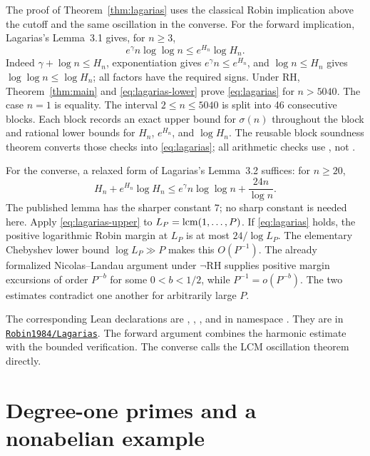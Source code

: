 \documentclass[11pt]{amsart}
\theoremstyle{definition}
\theoremstyle{remark}
\numberwithin{equation}{section}
\newcommand{\RH}{\mathrm{RH}}
\newcommand{\euler}{\gamma}
\newcommand{\sig}{\sigma}
\newcommand{\repositoryurl}{https://github.com/kimihiro64/Robin1984}
\newcommand{\proofrevision}{b359826e62c50b6cef55db4b2fcab793232498cc}
\newcommand{\codedir}[1]{%
  \href{\repositoryurl/tree/\proofrevision/#1}{\nolinkurl{#1}}}
\begin{document}
The proof of Theorem~\ref{thm:lagarias} uses the classical Robin
implication above the cutoff and the same oscillation in the converse.  For the forward implication, Lagarias's Lemma~3.1 gives,
for $n\ge3$,
\begin{equation}\label{eq:lagarias-lower}
  e^{\euler}n\log\log n\le e^{H_n}\log H_n.
\end{equation}
Indeed $\euler+\log n\le H_n$, exponentiation gives
$e^{\euler}n\le e^{H_n}$, and
$\log n\le H_n$ gives $\log\log n\le\log H_n$; all factors have the
required signs.  Under $\RH$, Theorem~\ref{thm:main} and
\eqref{eq:lagarias-lower} prove \eqref{eq:lagarias} for $n>5040$.
The case $n=1$ is equality.  The interval $2\le n\le5040$ is split into
46 consecutive blocks.  Each block records an exact upper bound for
$\sig(n)$ throughout the block and rational lower bounds for $H_n$,
$e^{H_n}$, and $\log H_n$.  The reusable block soundness theorem converts
those checks into \eqref{eq:lagarias}; all arithmetic checks use
, not .

For the converse, a relaxed form of Lagarias's Lemma~3.2 suffices:
for $n\ge20$,
\begin{equation}\label{eq:lagarias-upper}
 H_n+e^{H_n}\log H_n
 \le e^{\euler}n\log\log n+\frac{24n}{\log n}.
\end{equation}
The published lemma has the sharper constant $7$; no sharp constant is
needed here.  Apply \eqref{eq:lagarias-upper} to
$L_P=\mathop{\rm lcm}(1,\ldots,P)$.  If \eqref{eq:lagarias} holds, the
positive logarithmic Robin margin at $L_P$ is at most
$24/\log L_P$.  The elementary Chebyshev lower bound
$\log L_P\gg P$ makes this $O(P^{-1})$.  The already formalized
Nicolas--Landau argument under $\neg\RH$ supplies positive margin excursions
of order $P^{-b}$ for some $0<b<1/2$, while $P^{-1}=o(P^{-b})$.
The two estimates contradict one another for arbitrarily large $P$.

The corresponding Lean declarations are
,
,
, and
 in namespace
. They are in \codedir{Robin1984/Lagarias}.
The forward argument combines the harmonic estimate with the bounded
verification. The converse calls the LCM oscillation theorem directly.

\section{Degree-one primes and a nonabelian example}
\end{document}
